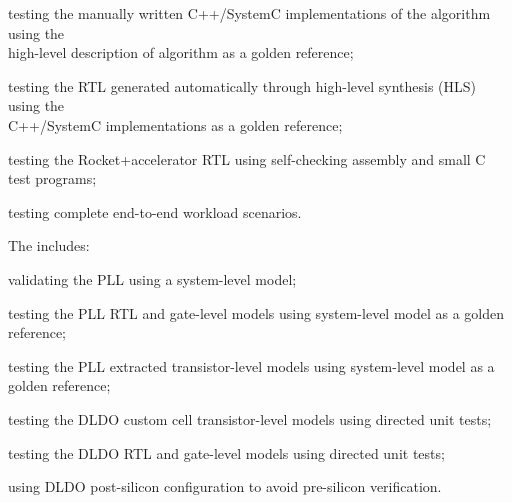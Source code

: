 \begin{cbxlist}{1.5em}{1em}{1em}
\begin{cbxlist}[--]{1.5em}{0em}{0em}
      \item testing the manually written C++/SystemC implementations of
         the algorithm using the \\\hspace{0.5em}high-level description
         of algorithm as a golden reference;

      \item testing the RTL generated automatically through high-level
         synthesis (HLS) using the \\\hspace{0.5em}C++/SystemC
         implementations as a golden reference;

      \item testing the Rocket+accelerator RTL using self-checking
         assembly and small C test programs;

      \item testing complete end-to-end workload scenarios.

    \end{cbxlist}

 \item The  includes:

    \smallskip
    \begin{cbxlist}[--]{1.5em}{0em}{0em}
      \raggedright

      \item validating the PLL using a system-level model;

      \item testing the PLL RTL and gate-level models using system-level
         model as a golden reference;

      \item testing the PLL extracted transistor-level models using
         system-level model as a golden reference;

      \item testing the DLDO custom cell transistor-level models using
         directed unit tests;

      \item testing the DLDO RTL and gate-level models using directed
         unit tests;

      \item using DLDO post-silicon configuration to avoid pre-silicon
         verification.

    \end{cbxlist}


\end{cbxlist}
